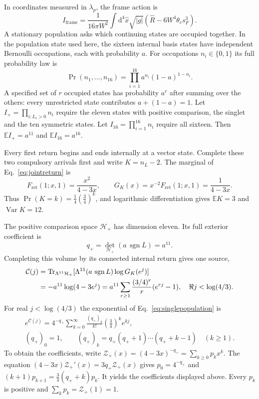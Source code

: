 \documentclass[aps,prx,onecolumn,10pt,notitlepage,nofootinbib,longbibliography]{revtex4-2}
\numberwithin{equation}{section}
\numberwithin{table}{section}
\newcommand{\EE}{\mathbb E}
\newcommand{\Tr}{\operatorname{Tr}}
\newcommand{\Var}{\operatorname{Var}}
\newcommand{\sgn}{\operatorname{sgn}}
\newcommand{\dd}{\mathrm d}
\newcommand{\lamP}{\lambda_p}
\newcommand{\Fret}{F_{\mathrm{ret}}}
\begin{document}
In coordinates measured in $\lamP$, the frame action is
\begin{equation}
 I_{\mathrm{frame}}=\frac1{16\pi W^2}
 \int\dd^4\widehat x\sqrt{|g|}
 (\widehat R-6W^4\theta_cs_F^3).
\end{equation}
A stationary population asks which continuing states are occupied together. In the population state used here, the sixteen internal basis states have independent Bernoulli occupations, each with probability $a$. For occupations $n_i\in\{0,1\}$ its full probability law is
\begin{equation}
 \Pr(n_1,\ldots,n_{16})=\prod_{i=1}^{16}a^{n_i}(1-a)^{1-n_i}.
 \label{eq:stationarypopulation}
\end{equation}
A specified set of $r$ occupied states has probability $a^r$ after summing over the others: every unrestricted state contributes $a+(1-a)=1$. Let $I_+=\prod_{i:L_i>0}n_i$ require the eleven states with positive comparison, the singlet and the ten symmetric states. Let $I_{16}=\prod_{i=1}^{16}n_i$ require all sixteen. Then $\EE I_+=a^{11}$ and $\EE I_{16}=a^{16}$.

Every first return begins and ends internally at a vector state. Complete
these two compulsory arrivals first and write $K=n_L-2$. The marginal of
Eq.~\eqref{eq:jointreturn} is
\begin{equation}
 \Fret(1;x,1)=\frac{x^2}{4-3x},\qquad
 G_K(x)=x^{-2}\Fret(1;x,1)=\frac1{4-3x}.
 \label{eq:connectedreturn}
\end{equation}
Thus $\Pr(K=k)=\tfrac14(\tfrac34)^k$, and logarithmic differentiation gives
$\EE K=3$ and $\Var K=12$.

The positive comparison space $\mathcal H_+$ has dimension eleven. Its full
exterior coefficient is
\begin{equation}
 q_+=\det_{\mathcal H_+}(a\,\sgn L)=a^{11}.
 \label{eq:positivevolume}
\end{equation}
Completing this volume by its connected internal return gives one source,
\begin{align}
 \mathcal C(j)
 &=\Tr_{\Lambda^{11}\mathcal H_+}
   [\Lambda^{11}(a\,\sgn L)\log G_K(e^j)]\notag\\
 &=-a^{11}\log(4-3e^j)
 =a^{11}\sum_{r\geq1}\frac{(3/4)^r}{r}(e^{rj}-1),
 \quad\Re j<\log(4/3).
 \label{eq:singlepopulation}
\end{align}
For real $j<\log(4/3)$ the exponential of Eq.~\eqref{eq:singlepopulation} is
\begin{equation}
 \begin{gathered}
 e^{\mathcal C(j)}
 =4^{-q_+}\sum_{k=0}^{\infty}
   \frac{(q_+)_k}{k!}\left(\frac34\right)^k e^{kj},\\
 (q_+)_0=1,\qquad
 (q_+)_k=q_+(q_++1)\cdots(q_++k-1)\quad(k\geq1).
 \end{gathered}
 \label{eq:positivestatisticalsource}
\end{equation}
To obtain the coefficients, write
$\mathcal Z_+(x)=(4-3x)^{-q_+}=\sum_{k\geq0}p_kx^k$.
The equation $(4-3x)\mathcal Z_+'(x)=3q_+\mathcal Z_+(x)$ gives
$p_0=4^{-q_+}$ and
$(k+1)p_{k+1}=\tfrac34(q_++k)p_k$.
It yields the coefficients displayed above. Every $p_k$ is positive
and $\sum_kp_k=\mathcal Z_+(1)=1$.
\end{document}
